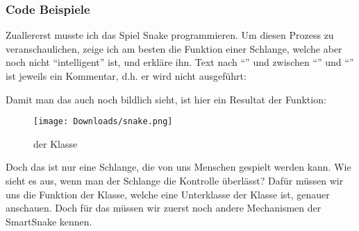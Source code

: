 \documentclass[11pt,a4paper,ngerman]{article}
\begin{document}
\subsubsection{Code Beispiele}

Zuallererst musste ich das Spiel Snake programmieren. Um diesen Prozess zu veranschaulichen, zeige ich am besten die  Funktion einer Schlange, welche aber noch nicht \enquote{intelligent} ist, und erkläre ihn. Text nach \enquote{\textCode{//}} und zwischen \enquote{\textCode{/*}} und \enquote{\textCode{*/}} ist jeweils ein Kommentar, d.h. er wird nicht ausgeführt:



Damit man das auch noch bildlich sieht, ist hier ein Resultat der  Funktion:

\bigskip
\begin{figure}[h] 
    \begin{center}
        \texttt{[image: Downloads/snake.png]}
        \caption{ der Klasse }
    \end{center}
\end{figure}

Doch das ist nur eine Schlange, die von uns Menschen gespielt werden kann. Wie sieht es aus, wenn man der Schlange die Kontrolle überlässt? Dafür müssen wir uns die  Funktion der  Klasse, welche eine Unterklasse der  Klasse ist, genauer anschauen. Doch für das müssen wir zuerst noch andere Mechanismen der SmartSnake kennen.


\end{document}
